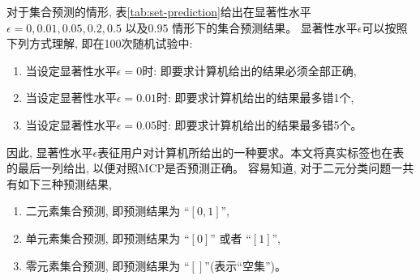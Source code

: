 对于集合预测的情形, 表\ref{tab:set-prediction}给出在显著性水平 $\epsilon = 0, 0.01, 0.05, 0.2, 0.5$ 以及$0.95$ 情形下的集合预测结果。 显著性水平$\epsilon$可以按照下列方式理解, 即在100次随机试验中:
\begin{enumerate}
\item 当设定显著性水平$\epsilon = 0$时: 即要求计算机给出的结果必须全部正确,
\item 当设定显著性水平$\epsilon = 0.01$时: 即要求计算机给出的结果最多错1个,
\item 当设定显著性水平$\epsilon = 0.05$时: 即要求计算机给出的结果最多错5个。
\end{enumerate}
因此, 显著性水平$\epsilon$表征用户对计算机所给出的一种要求。本文将真实标签也在表的最后一列给出, 以便对照MCP是否预测正确。 容易知道, 对于二元分类问题一共有如下三种预测结果, 
\begin{enumerate}
\item 二元素集合预测, 即预测结果为 “$[0,1]$”,
\item 单元素集合预测, 即预测结果为 “$[0]$” 或者 “$[1]$”,
\item 零元素集合预测, 即预测结果为 “$[]$”(表示“空集”)。
\end{enumerate}
